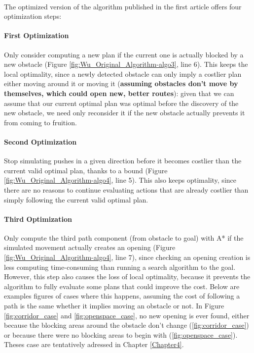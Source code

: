 \paragraph{} The optimized version of the algorithm published in the first article offers four optimization steps:

\paragraph{First Optimization}\label{optimization_1} Only consider computing a new plan if the current one is actually blocked by a new obstacle (Figure \ref{fig:Wu_Original_Algorithm-algo3}, line 6). This keeps the local optimality, since a newly detected obstacle can only imply a costlier plan either moving around it or moving it (\textbf{assuming obstacles don't move by themselves, which could open new, better routes}): given that we can assume that our current optimal plan was optimal before the discovery of the new obstacle, we need only reconsider it if the new obstacle actually prevents it from coming to fruition.

\paragraph{Second Optimization}\label{optimization_2} Stop simulating pushes in a given direction before it becomes costlier than the current valid optimal plan, thanks to a bound (Figure \ref{fig:Wu_Original_Algorithm-algo4}, line 5). This also keeps optimality, since there are no reasons to continue evaluating actions that are already costlier than simply following the current valid optimal plan.

\paragraph{Third Optimization}\label{optimization_3} Only compute the third path component (from obstacle to goal) with A* if the simulated movement actually creates an opening (Figure \ref{fig:Wu_Original_Algorithm-algo4}, line 7), since checking an opening creation is less computing time-consuming than running a search algorithm to the goal. However, this step also causes the loss of local optimality, because it prevents the algorithm to fully evaluate some plans that could improve the cost. Below are examples figures of cases where this happens, assuming the cost of following a path is the same whether it implies moving an obstacle or not. In Figure \ref{fig:corridor_case} and \ref{fig:openspace_case}, no new opening is ever found, either because the blocking areas around the obstacle don't change (\ref{fig:corridor_case}) or because there were no blocking areas to begin with (\ref{fig:openspace_case}). Theses case are tentatively adressed in Chapter \ref{Chapter4}.

